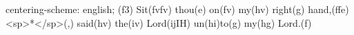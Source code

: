centering-scheme: english;
(f3) Sit(fvfv) thou(e) on(fv) my(hv) right(g) hand,(ffe) <sp>*</sp>(,) said(hv) the(iv) Lord(ijIH) un(hi)to(g) my(hg) Lord.(f)